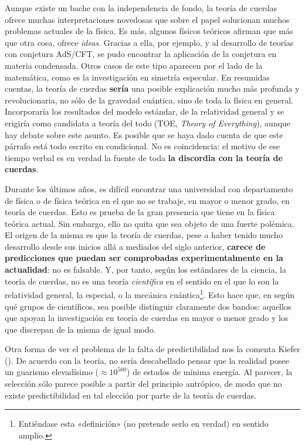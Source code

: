 \documentclass[11pt,a4paper,titlepage]{article}
\begin{document}
Aunque existe un bache con la independencia de fondo, la teoría de cuerdas ofrece muchas interpretaciones novedosas que sobre el papel solucionan muchos problemas actuales de la física. Es más, algunos físicos teóricos afirman que más que otra cosa, ofrece \textit{ideas}. Gracias a ella, por ejemplo, y al desarrollo de teorías con conjetura AdS/CFT, se pudo encontrar la aplicación de la conjetura en materia condensada. Otros casos de este tipo aparecen por el lado de la matemática, como es la investigación en simetría especular. En resumidas cuentas, la teoría de cuerdas \textbf{sería} una posible explicación mucho más profunda y revolucionaria, no sólo de la gravedad cuántica, sino de toda la física en general. Incorporaría los resultados del modelo estándar, de la relatividad general y se erigiría como candidata a teoría del todo (TOE, \textit{Theory of Everything}), aunque hay debate sobre este asunto. Es posible que se haya dado cuenta de que este párrafo está todo escrito en condicional. No es coincidencia: el motivo de ese tiempo verbal es en verdad la fuente de toda \textbf{la discordia con la teoría de cuerdas}.

Durante los últimos años, es difícil encontrar una universidad con departamento de física o de física teórica en el que no se trabaje, en mayor o menor grado, en teoría de cuerdas. Esto es prueba de la gran presencia que tiene en la física teórica actual. Sin embargo, ello no quita que sea objeto de una fuerte polémica. El origen de la misma es que la teoría de cuerdas, pese a haber tenido mucho desarrollo desde sus inicios allá a mediados del siglo anterior, \textbf{carece de predicciones que puedan ser comprobadas experimentalmente en la actualidad}: no es falsable. Y, por tanto, según los estándares de la ciencia, la teoría de cuerdas, no es una teoría \textit{científica} en el sentido en el que lo son la relatividad general, la especial, o la mecánica cuántica\footnote{Entiéndase esta «definición» (no pretende serlo en verdad) en sentido amplio.}. Esto hace que, en según qué grupos de científicos, sea posible distinguir claramente dos bandos: aquellos que apoyan la investigación en teoría de cuerdas en mayor o menor grado y los que discrepan de la misma de igual modo.

Otra forma de ver el problema de la falta de predictibilidad nos la comenta Kiefer (\cite[p.~8]{paper_osorio}). De acuerdo con la teoría, no sería descabellado pensar que la realidad posee un guarismo elevadísimo ($\approx10^{500}$) de estados de mínima energía. Al parecer, la selección sólo parece posible a partir del principio antrópico, de modo que no existe predictibilidad en tal elección por parte de la teoría de cuerdas.
\end{document}
